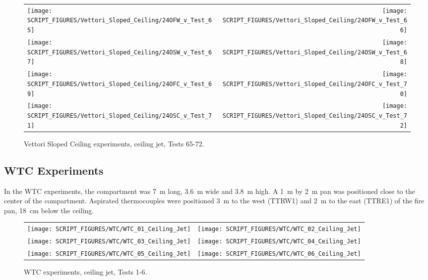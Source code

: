 \begin{figure}[p]
\begin{tabular*}{\textwidth}{l@{\extracolsep{\fill}}r}
\texttt{[image: SCRIPT\_FIGURES/Vettori\_Sloped\_Ceiling/24OFW\_v\_Test\_65]} &
\texttt{[image: SCRIPT\_FIGURES/Vettori\_Sloped\_Ceiling/24OFW\_v\_Test\_66]} \\
\texttt{[image: SCRIPT\_FIGURES/Vettori\_Sloped\_Ceiling/24OSW\_v\_Test\_67]} &
\texttt{[image: SCRIPT\_FIGURES/Vettori\_Sloped\_Ceiling/24OSW\_v\_Test\_68]} \\
\texttt{[image: SCRIPT\_FIGURES/Vettori\_Sloped\_Ceiling/24OFC\_v\_Test\_69]} &
\texttt{[image: SCRIPT\_FIGURES/Vettori\_Sloped\_Ceiling/24OFC\_v\_Test\_70]} \\
\texttt{[image: SCRIPT\_FIGURES/Vettori\_Sloped\_Ceiling/24OSC\_v\_Test\_71]} &
\texttt{[image: SCRIPT\_FIGURES/Vettori\_Sloped\_Ceiling/24OSC\_v\_Test\_72]} \\
\end{tabular*}
\caption{Vettori Sloped Ceiling experiments, ceiling jet, Tests 65-72.}
\label{Vettori_Sloped_9}
\end{figure}

\clearpage




\subsection{WTC Experiments}

In the WTC experiments, the compartment was 7~m long, 3.6~m wide and 3.8~m high. A 1~m by 2~m pan was positioned close to the center of the compartment. Aspirated thermocouples were positioned 3~m to the west (TTRW1) and 2~m to the east (TTRE1) of the fire pan, 18~cm below the ceiling.


\begin{figure}[h!]
\begin{tabular*}{\textwidth}{l@{\extracolsep{\fill}}r}
\texttt{[image: SCRIPT\_FIGURES/WTC/WTC\_01\_Ceiling\_Jet]} &
\texttt{[image: SCRIPT\_FIGURES/WTC/WTC\_02\_Ceiling\_Jet]} \\
\texttt{[image: SCRIPT\_FIGURES/WTC/WTC\_03\_Ceiling\_Jet]} &
\texttt{[image: SCRIPT\_FIGURES/WTC/WTC\_04\_Ceiling\_Jet]} \\
\texttt{[image: SCRIPT\_FIGURES/WTC/WTC\_05\_Ceiling\_Jet]} &
\texttt{[image: SCRIPT\_FIGURES/WTC/WTC\_06\_Ceiling\_Jet]}
\end{tabular*}
\caption{WTC experiments, ceiling jet, Tests 1-6.}
\label{WTC_Jet}
\end{figure}

